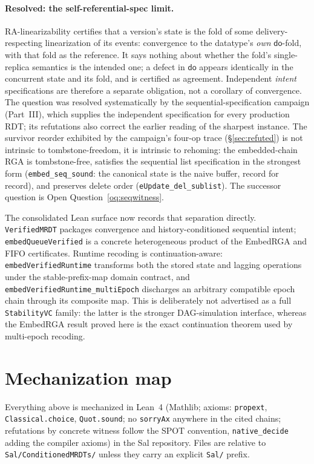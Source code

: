 \documentclass[11pt]{article}
\newcommand{\lean}[1]{\texttt{#1}}
\newcommand{\dodo}{\mathsf{do}}
\begin{document}
\paragraph{Resolved: the self-referential-spec limit.}
RA-linearizability certifies that a version's state is the fold of some
delivery-respecting linearization of its events: convergence to the
datatype's \emph{own} $\dodo$-fold, with that fold as the reference. It
says nothing about whether the fold's single-replica semantics is the
intended one; a defect in $\dodo$ appears identically in the concurrent
state and its fold, and is certified as agreement. Independent
\emph{intent} specifications are therefore a separate obligation, not a
corollary of convergence. The question was resolved systematically by
the sequential-specification campaign (Part~III), which supplies the
independent specification for every production RDT; its refutations
also correct the earlier reading of the sharpest instance. The survivor
reorder exhibited by the campaign's four-op trace
(\S\ref{sec:refuted}) is not intrinsic to tombstone-freedom, it is
intrinsic to rehoming: the embedded-chain RGA is tombstone-free,
satisfies the sequential list specification in the strongest form
(\lean{embed\_seq\_sound}: the canonical state is the naive buffer,
record for record), and preserves delete order
(\lean{eUpdate\_del\_sublist}). The successor question is Open
Question~\ref{oq:seqwitness}.

The consolidated Lean surface now records that separation directly.
\lean{VerifiedMRDT} packages convergence and history-conditioned sequential
intent; \lean{embedQueueVerified} is a concrete heterogeneous product of the
EmbedRGA and FIFO certificates.  Runtime recoding is continuation-aware:
\lean{embedVerifiedRuntime} transforms both the stored state and lagging
operations under the stable-prefix-map domain contract, and
\lean{embedVerifiedRuntime\_multiEpoch} discharges an arbitrary compatible
epoch chain through its composite map.  This is deliberately not advertised
as a full \lean{StabilityVC} family: the latter is the stronger DAG-simulation
interface, whereas the EmbedRGA result proved here is the exact continuation
theorem used by multi-epoch recoding.

\section{Mechanization map}
\label{sec:mech}

Everything above is mechanized in Lean~4 (Mathlib; axioms:
\lean{propext}, \lean{Classical.choice}, \lean{Quot.sound}; no
\lean{sorryAx} anywhere in the cited chains; refutations by concrete
witness follow the SPOT convention, \lean{native\_decide} adding the
compiler axioms) in the Sal repository. Files are relative to
\lean{Sal/ConditionedMRDTs/} unless they carry an explicit
\lean{Sal/} prefix.
\end{document}
